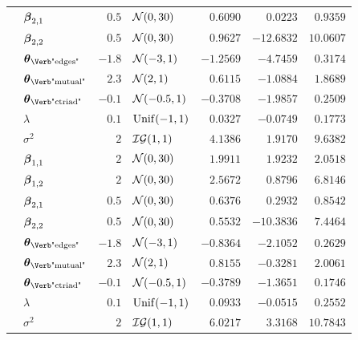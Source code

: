 \begin{table}[t]
\begin{tabular}{cl|rlrrr}
        & $\boldsymbol{\beta}_{2,1}$                   & $0.5$  & $\mathcal{N}(0,30)$      & $0.6090$  & $0.0223$   & $0.9359$  \\
        & $\boldsymbol{\beta}_{2,2}$                   & $0.5$  & $\mathcal{N}(0,30)$      & $0.9627$  & $-12.6832$ & $10.0607$ \\
        & $\ttheta_{\text{\Verb"edges"}}$  & $-1.8$ & $\mathcal{N}(-3,1)$      & $-1.2569$ & $-4.7459$  & $0.3174$  \\
        & $\ttheta_{\text{\Verb"mutual"}}$ & $2.3$  & $\mathcal{N}(2,1)$       & $0.6115$  & $-1.0884$  & $1.8689$  \\
        & $\ttheta_{\text{\Verb"ctriad"}}$ & $-0.1$ & $\mathcal{N}(-0.5,1)$    & $-0.3708$ & $-1.9857$  & $0.2509$  \\
		\midrule
        & $\lambda$                        & $0.1$  & $\mathrm{Unif}(-1,1)$     & $0.0327$  & $-0.0749$  & $0.1773$ \\
        & $\sigma^2$                       & $2$    & $\mathcal{IG}(1,1)$ & $4.1386$  & $1.9170$   & $9.6382$ \\
        & $\boldsymbol{\beta}_{1,1}$                   & $2$    & $\mathcal{N}(0,30)$      & $1.9911$  & $1.9232$   & $2.0518$ \\
        & $\boldsymbol{\beta}_{1,2}$                   & $2$    & $\mathcal{N}(0,30)$      & $2.5672$  & $0.8796$   & $6.8146$ \\
        & $\boldsymbol{\beta}_{2,1}$                   & $0.5$  & $\mathcal{N}(0,30)$      & $0.6376$  & $0.2932$   & $0.8542$ \\
        & $\boldsymbol{\beta}_{2,2}$                   & $0.5$  & $\mathcal{N}(0,30)$      & $0.5532$  & $-10.3836$ & $7.4464$ \\
        & $\ttheta_{\text{\Verb"edges"}}$  & $-1.8$ & $\mathcal{N}(-3,1)$      & $-0.8364$ & $-2.1052$  & $0.2629$ \\
        & $\ttheta_{\text{\Verb"mutual"}}$ & $2.3$  & $\mathcal{N}(2,1)$       & $0.8155$  & $-0.3281$  & $2.0061$ \\
        & $\ttheta_{\text{\Verb"ctriad"}}$ & $-0.1$ & $\mathcal{N}(-0.5,1)$    & $-0.3789$ & $-1.3651$  & $0.1746$ \\
		\midrule
		\midrule
        & $\lambda$                        & $0.1$  & $\mathrm{Unif}(-1,1)$     & $0.0933$  & $-0.0515$ & $0.2552$  \\
        & $\sigma^2$                       & $2$    & $\mathcal{IG}(1,1)$ & $6.0217$  & $3.3168$  & $10.7843$ \\

\end{tabular}
\end{table}

